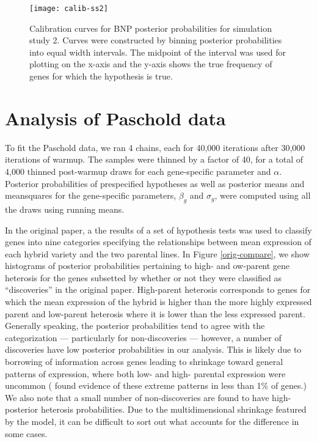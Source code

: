 \begin{figure}[ht!]
\centering
\texttt{[image: calib-ss2]}
\begin{minipage}{.8\textwidth}
\caption{\small Calibration curves for BNP posterior probabilities for simulation study 2. Curves were constructed by binning posterior probabilities into equal width intervals. The midpoint of the interval was used for plotting on the x-axis and the y-axis shows the true frequency of genes for which the hypothesis is true.}
\end{minipage}
\label{calib-ss2}
\end{figure}

\section{Analysis of Paschold data}
\label{analysis}
To fit the Paschold data, we ran 4 chains, each for 40,000 iterations after 30,000 iterations of warmup. The samples were thinned by a factor of 40, for a total of 4,000 thinned post-warmup draws for each gene-specific parameter and $\alpha$. Posterior probabilities of prespecified hypotheses as well as posterior means and meansquares for the gene-specific parameters, $\beta_g$ and $\sigma_g$, were computed using all the draws using running means.

In the original paper, a the results of a set of hypothesis tests was used to classify genes into nine categories specifying the relationships between mean expression of each hybrid variety and the two parental lines. In Figure \ref{orig-compare}, we show histograms of posterior probabilities pertaining to high- and ow-parent gene heterosis for the genes subsetted by whether or not they were classified as ``discoveries'' in the original paper. High-parent heterosis corresponds to genes for which the mean expression of the hybrid is higher than the more highly expressed parent and low-parent heterosis where it is lower than the less expressed parent. Generally speaking, the posterior probabilities tend to agree with the categorization --- particularly for non-discoveries --- however, a number of discoveries have low posterior probabilities in our analysis. This is likely due to borrowing of information across genes leading to shrinkage toward general patterns of expression, where both low- and high- parental expression were uncommon (\citet{paschold} found evidence of these extreme patterns in less than 1\% of genes.) We also note that a small number of non-discoveries are found to have high-posterior heterosis probabilities. Due to the multidimensional shrinkage featured by the model, it can be difficult to sort out what accounts for the difference in some cases.


